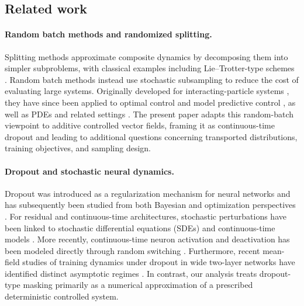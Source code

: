 \documentclass[twoside,11pt]{article}
\theoremstyle{plain}
\begin{document}
\subsection{Related work}

\paragraph{\textbf{Random batch methods and randomized splitting.}}
Splitting methods approximate composite dynamics by decomposing them into simpler subproblems, with classical examples including Lie--Trotter-type schemes \cite{trotter59,MacNamara2016,LANSER1999201}. Random batch methods instead use stochastic subsampling to reduce the cost of evaluating large systems. Originally developed for interacting-particle systems \cite{JIN2020108877,MR4230431}, they have since been applied to optimal control and model predictive control \cite{MR4433122,veldman2023stability}, as well as PDEs and related settings \cite{MR4361973,MR4436794,MR4744252,eisenmann2022randomized,hernandezcorella2025,discretizedRBM,continuousRBM}. The present paper adapts this random-batch viewpoint to additive controlled vector fields, framing it as continuous-time dropout and leading to additional questions concerning transported distributions, training objectives, and sampling design. 

\paragraph{\textbf{Dropout and stochastic neural dynamics.}}
Dropout was introduced as a regularization mechanism for neural networks \cite{srivastava2014dropout,pmlrwan13} and has subsequently been studied from both Bayesian and optimization perspectives \cite{gal2017concretedropout,NIPS2015_bc731692,mianjy2020convergence}. For residual and continuous-time architectures, stochastic perturbations have been linked to stochastic differential equations (SDEs) and continuous-time models \cite{Sun2018StochasticTO,Liu2020_Neural_SDE}. More recently, continuous-time neuron activation and deactivation has been modeled directly through random switching \cite{lee2026neural}. Furthermore, recent mean-field studies of training dynamics under dropout in wide two-layer networks have identified distinct asymptotic regimes \cite{chizat2025phasediagramdropouttwolayer}. In contrast, our analysis treats dropout-type masking primarily as a numerical approximation of a prescribed deterministic controlled system.
\end{document}
